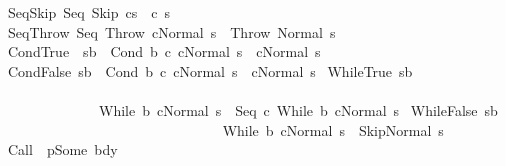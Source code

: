 \begin{isabellebody}
{\isacharbar}\ SeqSkip{\isacharcolon}\ {\isachardoublequoteopen}{\isasymGamma}{\isasymturnstile}{\isacharparenleft}Seq\ Skip\ cs{\isacharparenright}\ {\isasymrightarrow}\ {\isacharparenleft}c\ s{\isacharparenright}{\isachardoublequoteclose}\isanewline
{\isacharbar}\ SeqThrow{\isacharcolon}\ {\isachardoublequoteopen}{\isasymGamma}{\isasymturnstile}{\isacharparenleft}Seq\ Throw\ cNormal\ s{\isacharparenright}\ {\isasymrightarrow}\ {\isacharparenleft}Throw{\isacharcomma}\ Normal\ s{\isacharparenright}{\isachardoublequoteclose}\isanewline
\isanewline
{\isacharbar}\ CondTrue{\isacharcolon}\ \ {\isachardoublequoteopen}s{\isasymin}b\ {\isasymLongrightarrow}\ {\isasymGamma}{\isasymturnstile}{\isacharparenleft}Cond\ b\ c\ cNormal\ s{\isacharparenright}\ {\isasymrightarrow}\ {\isacharparenleft}cNormal\ s{\isacharparenright}{\isachardoublequoteclose}\isanewline
{\isacharbar}\ CondFalse{\isacharcolon}\ {\isachardoublequoteopen}s{\isasymnotin}b\ {\isasymLongrightarrow}\ {\isasymGamma}{\isasymturnstile}{\isacharparenleft}Cond\ b\ c\ cNormal\ s{\isacharparenright}\ {\isasymrightarrow}\ {\isacharparenleft}cNormal\ s{\isacharparenright}{\isachardoublequoteclose}\isanewline
\isanewline
{\isacharbar}\ WhileTrue{\isacharcolon}\ {\isachardoublequoteopen}{\isasymlbrakk}s{\isasymin}b{\isasymrbrakk}\ \isanewline
\ \ \ \ \ \ \ \ \ \ \ \ \ \ {\isasymLongrightarrow}\ \isanewline
\ \ \ \ \ \ \ \ \ \ \ \ \ \ {\isasymGamma}{\isasymturnstile}{\isacharparenleft}While\ b\ c{\isacharcomma}Normal\ s{\isacharparenright}\ {\isasymrightarrow}\ {\isacharparenleft}Seq\ c\ {\isacharparenleft}While\ b\ c{\isacharparenright}{\isacharcomma}Normal\ s{\isacharparenright}{\isachardoublequoteclose}\isanewline
\isanewline
{\isacharbar}\ WhileFalse{\isacharcolon}\ {\isachardoublequoteopen}{\isasymlbrakk}s{\isasymnotin}b{\isasymrbrakk}\ \isanewline
\ \ \ \ \ \ \ \ \ \ \ \ \ \ \ {\isasymLongrightarrow}\ \isanewline
\ \ \ \ \ \ \ \ \ \ \ \ \ \ \ {\isasymGamma}{\isasymturnstile}{\isacharparenleft}While\ b\ c{\isacharcomma}Normal\ s{\isacharparenright}\ {\isasymrightarrow}\ {\isacharparenleft}Skip{\isacharcomma}Normal\ s{\isacharparenright}{\isachardoublequoteclose}\isanewline
\isanewline
{\isacharbar}\ Call{\isacharcolon}\ {\isachardoublequoteopen}{\isasymGamma}\ p{\isacharequal}Some\ bdy\ {\isasymLongrightarrow}\isanewline

\end{isabellebody}
